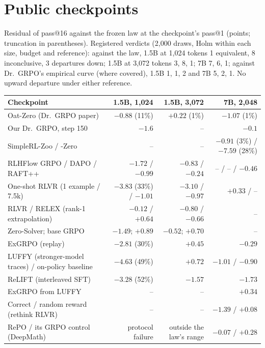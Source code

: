 \documentclass{article}
\theoremstyle{plain}
\begin{document}
\section{Public checkpoints}\label{app:public}
Residual of pass@16 against the frozen law at the checkpoint's pass@1 (points; truncation in parentheses). Registered verdicts (2,000 draws, Holm within each size, budget and reference): against the law, 1.5B at 1,024 tokens 1 equivalent, 8 inconclusive, 3 departures down; 1.5B at 3,072 tokens 3, 8, 1; 7B 7, 6, 1; against Dr.\ GRPO's empirical curve (where covered), 1.5B 1, 1, 2 and 7B 5, 2, 1. No upward departure under either reference.
\begin{center}\small
\begin{tabular}{@{}lrrr@{}}
\toprule
Checkpoint & 1.5B, 1,024 & 1.5B, 3,072 & 7B, 2,048\\
\midrule
Oat-Zero (Dr.\ GRPO paper) & $-0.88$ (11\%) & $+0.22$ (1\%) & $-1.07$ (1\%)\\
Our Dr.\ GRPO, step 150 & $-1.6$ & -- & $-0.1$\\
SimpleRL-Zoo / -Zero & -- & -- & $-0.91$ (3\%) / $-7.59$ (28\%)\\
RLHFlow GRPO / DAPO / RAFT++ & $-1.72$ / $-0.99$ & $-0.83$ / $-0.24$ & -- / -- / $-0.46$\\
One-shot RLVR (1 example / 7.5k) & $-3.83$ (33\%) / $-1.01$ & $-3.10$ / $-0.97$ & $+0.33$ / --\\
RLVR / RELEX (rank-1 extrapolation) & $-0.12$ / $+0.64$ & $-0.80$ / $-0.66$ & --\\
Zero-Solver; base GRPO & $-1.49$; $+0.89$ & $-0.52$; $+0.70$ & --\\
ExGRPO (replay) & $-2.81$ (30\%) & $+0.45$ & $-0.29$\\
LUFFY (stronger-model traces) / on-policy baseline & $-4.63$ (49\%) & $+0.72$ & $-1.01$ / $-0.90$\\
ReLIFT (interleaved SFT) & $-3.28$ (52\%) & $-1.57$ & $-1.73$\\
ExGRPO from LUFFY & -- & -- & $+0.34$\\
Correct / random reward (rethink RLVR) & -- & -- & $-1.39$ / $+0.08$\\
RePO / its GRPO control (DeepMath) & protocol failure & outside the law's range & $-0.07$ / $+0.28$\\
\bottomrule
\end{tabular}
\end{center}
\end{document}
